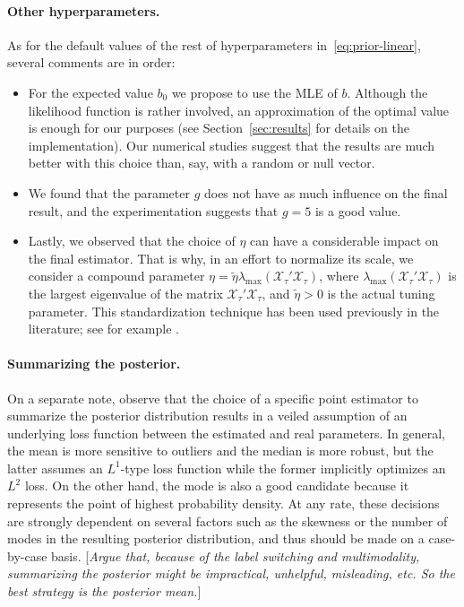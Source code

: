 \documentclass[ba]{imsart}
\numberwithin{equation}{section}
\theoremstyle{plain}
\newcommand\incomment[2][comment-red]{\color{#1}[\textit{#2}]\color{black}}
\begin{document}
\paragraph{Other hyperparameters.} As for the default values of the rest of hyperparameters in~\eqref{eq:prior-linear}, several comments are in order:
\begin{itemize}
  \item For the expected value \(b_0\) we propose to use the MLE of \(b\). Although the likelihood function is rather involved, an approximation of the optimal value is enough for our purposes (see Section~\ref{sec:results} for details on the implementation). Our numerical studies suggest that the results are much better with this choice than, say, with a random or null vector.
  \item We found that the parameter \(g\) does not have as much influence on the final result, and the experimentation suggests that \(g=5\) is a good value.
  \item Lastly, we observed that the choice of \(\eta\) can have a considerable impact on the final estimator. That is why, in an effort to normalize its scale, we consider a compound parameter \(\eta = \tilde \eta \lambda_{\max}(\mathcal X_\tau'\mathcal X_\tau)\), where \(\lambda_{\max}(\mathcal X_\tau'\mathcal X_\tau)\) is the largest eigenvalue of the matrix \(\mathcal X_\tau'\mathcal X_\tau\), and \(\tilde\eta > 0\) is the actual tuning parameter. This standardization technique has been used previously in the literature; see for example \citet{grollemund2019bayesian}.
\end{itemize}

\paragraph{Summarizing the posterior.} On a separate note, observe that the choice of a specific point estimator to summarize the posterior distribution results in a veiled assumption of an underlying loss function between the estimated and real parameters. In general, the mean is more sensitive to outliers and the median is more robust, but the latter assumes an \(L^1\)-type loss function while the former implicitly optimizes an \(L^2\) loss. On the other hand, the mode is also a good candidate because it represents the point of highest probability density. At any rate, these decisions are strongly dependent on several factors such as the skewness or the number of modes in the resulting posterior distribution, and thus should be made on a case-by-case basis. \incomment{Argue that, because of the label switching and multimodality, summarizing the posterior might be impractical, unhelpful, misleading, etc. So the best strategy is the posterior mean.}
\end{document}
